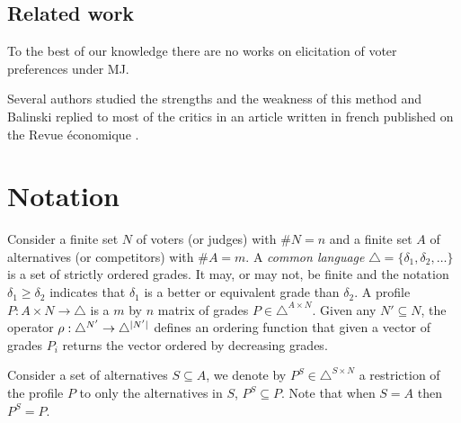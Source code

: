 \documentclass[version=3.21, pagesize, twoside=off, bibliography=totoc, DIV=calc, fontsize=12pt, a4paper]{scrartcl}
\begin{document}
\subsection{Related work}

To the best of our knowledge there are no works on elicitation of voter preferences under \acs{MJ}.

Several authors studied the strengths and the weakness of this method \citep{Felsenthal2008,Laslier2018} and Balinski replied to most of the critics in an article written in french published on the Revue économique \citep{Balinski2019}.




\section{Notation}
\label{sec:complete}
Consider a finite set $N$ of voters (or judges) with $\#N=n$ and a finite set $A$ of alternatives (or competitors) with $\#A=m$. 
A \textit{common language} $\triangle = \{ \delta_1, \delta_2, \dots \}$ is a set of strictly ordered grades. It may, or may not, be finite and the notation $\delta_1 \geq \delta_2$ indicates that $\delta_1$ is a better or equivalent grade than $\delta_2$. A profile $P : A\times N \rightarrow \triangle$ is a $m$ by $n$ matrix of grades $P \in \triangle^{A \times N}$. Given any $N'\subseteq N$, the operator $\rho: \triangle^{N'} \rightarrow \triangle^{\lvert N'\rvert}$ defines an ordering function that given a vector of grades $P_i$ returns the vector ordered by decreasing grades.

Consider a set of alternatives $S\subseteq A$,
we denote by $P^S \in \triangle^{S \times N}$ a restriction of the profile $P$ to only the alternatives in $S$, $P^S \subseteq P$. Note that when $S=A$ then $P^S=P$.
\end{document}
